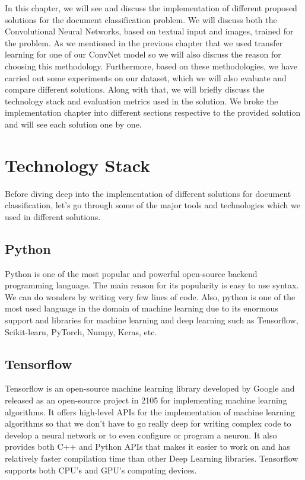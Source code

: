 \par
In this chapter, we will see and discuss the implementation of different proposed solutions for the document classification problem. We will discuss both the Convolutional Neural Networks, based on textual input and images, trained for the problem. As we mentioned in the previous chapter that we used transfer learning for one of our ConvNet model so we will also discuss the reason for choosing this methodology. Furthermore, based on these methodologies, we have carried out some experiments on our dataset, which we will also evaluate and compare different solutions. Along with that, we will briefly discuss the technology stack and evaluation metrics used in the solution. We broke the implementation chapter into different sections respective to the provided solution and will see each solution one by one.
\section{Technology Stack}
\par
Before diving deep into the implementation of different solutions for document classification, let's go through some of the major tools and technologies which we used in different solutions.
\subsection{Python}
Python is one of the most popular and powerful open-source backend programming language. The main reason for its popularity is easy to use syntax. We can do wonders by writing very few lines of code. Also, python is one of the most used language in the domain of machine learning due to its enormous support and libraries for machine learning and deep learning such as Tensorflow, Scikit-learn, PyTorch, Numpy, Keras, etc.
\subsection{Tensorflow}
Tensorflow is an open-source machine learning library developed by Google and released as an open-source project in 2105 for implementing machine learning algorithms. It offers high-level APIs for the implementation of machine learning algorithms so that we don't have to go really deep for writing complex code to develop a neural network or to even configure or program a neuron. It also provides both C++ and Python APIs that makes it easier to work on and has relatively faster compilation time than other Deep Learning libraries. Tensorflow supports both CPU's and GPU's computing devices.
